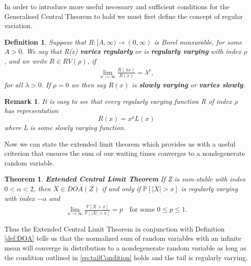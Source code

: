 \documentclass[honours,12pt]{unswthesis}
\newcommand{\PP}{\mathbb{P}}
\newcommand{\1}{\mathbf 1}
\newtheorem{theorem}[equation]{Theorem}
\newtheorem{definition}[equation]{Definition}
\newtheorem{remark}[equation]{Remark}
\numberwithin{equation}{section}
\theoremstyle{definition}
\theoremstyle{remark}
\begin{document}
In order to introduce more useful necessary and sufficient conditions for the Generalised Central Theorem to hold we must first define the concept of regular variation.
\begin{definition}\label{def:RV}
	Suppose that $R:[A,\infty)\to(0,\infty)$ is Borel measurable, for some $A>0$. We say that R(x) \textbf{varies regularly} or is \textbf{regularly varying} with index $\rho$, and we write $R\in RV(\rho)$, if
	\begin{align*}
	\lim_{x\to\infty}\frac{R(\lambda x)}{R(x)}=\lambda^\rho, 
	\end{align*}
	for all $\lambda>0.$ If $\rho=0$ we then say $R(x)$ is \textbf{slowly varying} or \textbf{varies slowly}.\\
\end{definition}
\begin{remark}
	It is easy to see that every regularly varying function R of index $\rho$ has representation
	\[
		R(x)=x^\rho L(x)
	\]
	where L is some slowly varying function.\\
\end{remark}
Now we can state the extended limit theorem which provides us with a useful criterion that ensures the sum of our waiting times converges to a nondegenerate random variable.
\begin{theorem}\label{th:ECLT}\cite[Th.~4.5]{MeerschaertSikorskii2012}
	\textbf{Extended Central Limit Theorem} If Z is sum-stable with index $0<\alpha<2$, then $X\in DOA(Z)$ if and only if $\PP[|X|>x]$ is regularly varying with index $-\alpha$ and
	\begin{align}\label{eq:tailCondition}
			\lim_{x\to\infty}\frac{\PP[X>x]}{\PP[|X|>x]}=p\quad\textrm{for some }0\leq p\leq1.
	\end{align}
\end{theorem}
\noindent Thus the Extended Central Limit Theorem in conjunction with Definition \ref{def:DOA} tells us that the normalized sum of random variables with an infinite mean will converge in distribution to a nondegenerate random variable as long as the condition outlined in \ref{eq:tailCondition} holds and the tail is regularly varying.
\end{document}
